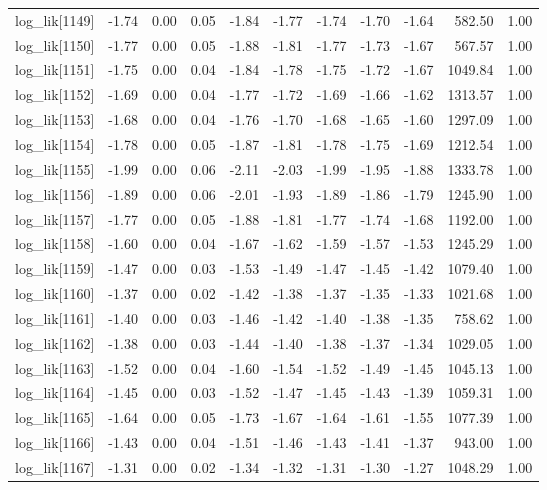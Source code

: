 \begin{table}[ht]
\begin{tabular}{rrrrrrrrrrr}
  log\_lik[1149] & -1.74 & 0.00 & 0.05 & -1.84 & -1.77 & -1.74 & -1.70 & -1.64 & 582.50 & 1.00 \\ 
  log\_lik[1150] & -1.77 & 0.00 & 0.05 & -1.88 & -1.81 & -1.77 & -1.73 & -1.67 & 567.57 & 1.00 \\ 
  log\_lik[1151] & -1.75 & 0.00 & 0.04 & -1.84 & -1.78 & -1.75 & -1.72 & -1.67 & 1049.84 & 1.00 \\ 
  log\_lik[1152] & -1.69 & 0.00 & 0.04 & -1.77 & -1.72 & -1.69 & -1.66 & -1.62 & 1313.57 & 1.00 \\ 
  log\_lik[1153] & -1.68 & 0.00 & 0.04 & -1.76 & -1.70 & -1.68 & -1.65 & -1.60 & 1297.09 & 1.00 \\ 
  log\_lik[1154] & -1.78 & 0.00 & 0.05 & -1.87 & -1.81 & -1.78 & -1.75 & -1.69 & 1212.54 & 1.00 \\ 
  log\_lik[1155] & -1.99 & 0.00 & 0.06 & -2.11 & -2.03 & -1.99 & -1.95 & -1.88 & 1333.78 & 1.00 \\ 
  log\_lik[1156] & -1.89 & 0.00 & 0.06 & -2.01 & -1.93 & -1.89 & -1.86 & -1.79 & 1245.90 & 1.00 \\ 
  log\_lik[1157] & -1.77 & 0.00 & 0.05 & -1.88 & -1.81 & -1.77 & -1.74 & -1.68 & 1192.00 & 1.00 \\ 
  log\_lik[1158] & -1.60 & 0.00 & 0.04 & -1.67 & -1.62 & -1.59 & -1.57 & -1.53 & 1245.29 & 1.00 \\ 
  log\_lik[1159] & -1.47 & 0.00 & 0.03 & -1.53 & -1.49 & -1.47 & -1.45 & -1.42 & 1079.40 & 1.00 \\ 
  log\_lik[1160] & -1.37 & 0.00 & 0.02 & -1.42 & -1.38 & -1.37 & -1.35 & -1.33 & 1021.68 & 1.00 \\ 
  log\_lik[1161] & -1.40 & 0.00 & 0.03 & -1.46 & -1.42 & -1.40 & -1.38 & -1.35 & 758.62 & 1.00 \\ 
  log\_lik[1162] & -1.38 & 0.00 & 0.03 & -1.44 & -1.40 & -1.38 & -1.37 & -1.34 & 1029.05 & 1.00 \\ 
  log\_lik[1163] & -1.52 & 0.00 & 0.04 & -1.60 & -1.54 & -1.52 & -1.49 & -1.45 & 1045.13 & 1.00 \\ 
  log\_lik[1164] & -1.45 & 0.00 & 0.03 & -1.52 & -1.47 & -1.45 & -1.43 & -1.39 & 1059.31 & 1.00 \\ 
  log\_lik[1165] & -1.64 & 0.00 & 0.05 & -1.73 & -1.67 & -1.64 & -1.61 & -1.55 & 1077.39 & 1.00 \\ 
  log\_lik[1166] & -1.43 & 0.00 & 0.04 & -1.51 & -1.46 & -1.43 & -1.41 & -1.37 & 943.00 & 1.00 \\ 
  log\_lik[1167] & -1.31 & 0.00 & 0.02 & -1.34 & -1.32 & -1.31 & -1.30 & -1.27 & 1048.29 & 1.00 \\ 

\end{tabular}
\end{table}
